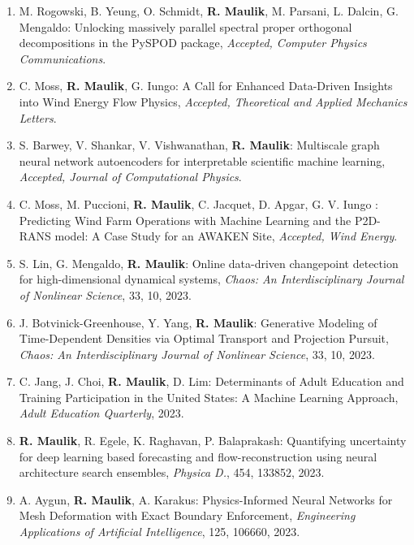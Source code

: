 \documentclass[letterpaper]{article}
\begin{document}
\begin{enumerate}

\item M. Rogowski, B. Yeung, O. Schmidt, \textbf{R. Maulik}, M. Parsani, L. Dalcin, G. Mengaldo: Unlocking massively parallel spectral proper orthogonal decompositions in the PySPOD package, {\it Accepted, Computer Physics Communications}.

\item C. Moss, \textbf{R. Maulik}, G. Iungo: A Call for Enhanced Data-Driven Insights into Wind Energy Flow Physics, {\it Accepted, Theoretical and Applied Mechanics Letters}.

\item S. Barwey, V. Shankar, V. Vishwanathan, \textbf{R. Maulik}: Multiscale graph neural network autoencoders for interpretable scientific machine learning, {\it Accepted, Journal of Computational Physics}.

\item C. Moss, M. Puccioni, \textbf{R. Maulik}, C. Jacquet, D. Apgar, G. V. Iungo : Predicting Wind Farm Operations with Machine Learning and the P2D-RANS model: A Case Study for an AWAKEN Site, {\it Accepted, Wind Energy}.

\item S. Lin, G. Mengaldo, \textbf{R. Maulik}: Online data-driven changepoint detection for high-dimensional dynamical systems, {\it Chaos: An Interdisciplinary Journal of Nonlinear Science}, 33, 10, 2023.

\item J. Botvinick-Greenhouse, Y. Yang, \textbf{R. Maulik}: Generative Modeling of Time-Dependent Densities via Optimal Transport and Projection Pursuit, {\it Chaos: An Interdisciplinary Journal of Nonlinear Science}, 33, 10, 2023.

\item C. Jang, J. Choi, \textbf{R. Maulik}, D. Lim: Determinants of Adult Education and Training Participation in the United States: A Machine Learning Approach, {\it Adult Education Quarterly}, 2023.

\item \textbf{R. Maulik}, R. Egele, K. Raghavan, P. Balaprakash: Quantifying uncertainty for deep learning based forecasting and flow-reconstruction using neural architecture search ensembles, {\it Physica D.}, 454, 133852, 2023.

\item A. Aygun, \textbf{R. Maulik}, A. Karakus: Physics-Informed Neural Networks for Mesh Deformation with Exact Boundary Enforcement, {\it Engineering Applications of Artificial Intelligence}, 125, 106660, 2023.


\end{enumerate}
\end{document}
